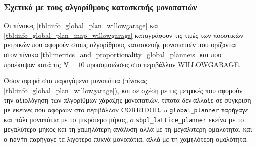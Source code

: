 \subsubsection{Σχετικά με τους αλγορίθμους κατασκευής μονοπατιών}

Οι πίνακες \ref{tbl:info_global_plan_willowgarage}
και \ref{tbl:info_global_plan_map_willowgarage} καταγράφουν τις τιμές
των ποσοτικών μετρικών που αφορούν στους αλγορίθμους κατασκευής μονοπατιών που
ορίζονται στον πίνακα \ref{tbl:metrics_and_proportionality_global_planners} και
που προέκυψαν κατά τις $N = 10$ προσομοιώσεις στο περιβάλλον WILLOWGARAGE.

Όσον αφορά στα παραγόμενα μονοπάτια (πίνακας
\ref{tbl:info_global_plan_willowgarage}), και σε σχέση με τις μετρικές που
αφορούν την αξιολόγηση των αλγορίθμων χάραξης μονοπατιών, τίποτα δεν άλλαξε σε
σύγκριση με εκείνες που αφορούν στο περιβάλλον CORRIDOR: o
\texttt{global\_planner} παρήγαγε και πάλι μονοπάτια με το μικρότερο μήκος, o
\texttt{sbpl\_lattice\_planner} εκείνα με το μεγαλύτερο μήκος και τη χαμηλότερη
ανάλυση αλλά με τη μεγαλύτερη ομαλότητα, και ο \texttt{navfn} παρήγαγε τα
λιγότερο πυκνά μονοπάτια, αλλά με τη χαμηλότερη ομαλότητα.

